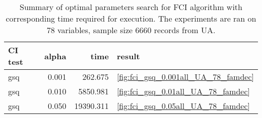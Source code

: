 \begin{table}
\caption{Summary of optimal parameters search for FCI algorithm with corresponding time required for execution. The experiments are ran on 78 variables, sample size 6660 records from UA.}
\label{tab:fci_parameters_time_UA_78_famdec}
\begin{tabular}{lrrl}
\toprule
CI test & alpha & time & result \\
\midrule
gsq & 0.001 & 262.675 & \ref{fig:fci_gsq_0.001all_UA_78_famdec} \\
gsq & 0.010 & 5850.981 & \ref{fig:fci_gsq_0.01all_UA_78_famdec} \\
gsq & 0.050 & 19390.311 & \ref{fig:fci_gsq_0.05all_UA_78_famdec} \\
\bottomrule
\end{tabular}
\end{table}
